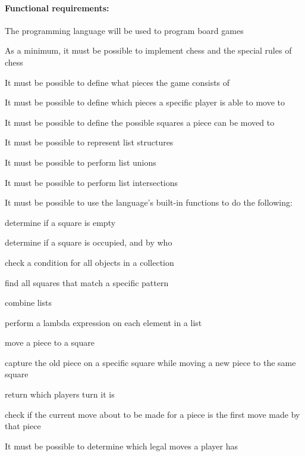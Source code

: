 \paragraph*{Functional requirements:}
\begin{dlist}
  \item The programming language will be used to program board games
  \begin{dlist}
    \item As a minimum, it must be possible to implement chess and the special rules of chess
  \end{dlist}
  \item It must be possible to define what pieces the game consists of
  \item It must be possible to define which pieces a specific player is able to move to
  \item It must be possible to define the possible squares a piece can be moved to
  \item It must be possible to represent list structures
  \begin{dlist}
    \item It must be possible to perform list unions
    \item It must be possible to perform list intersections
  \end{dlist}
  \item It must be possible to use the language’s built-in functions to do the following:
  \begin{dlist}
    \item determine if a square is empty
    \item determine if a square is occupied, and by who
    \item check a condition for all objects in a collection
    \item find all squares that match a specific pattern
    \item combine lists
    \item perform a lambda expression on each element in a list
    \item move a piece to a square
    \item capture the old piece on a specific square while moving a new piece to the same square
    \item return which players turn it is
    \item check if the current move about to be made for a piece is the first move made by that piece
  \end{dlist}
  \item It must be possible to determine which legal moves a player has

\end{dlist}
